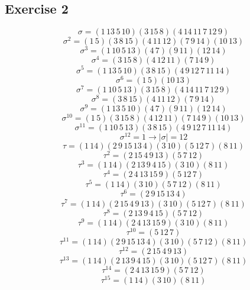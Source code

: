 \documentclass[12pt]{article}
\begin{document}
\begin{itemize}
\subsection*{Exercise 2}
$$\sigma = (1 \, 13 \, 5 \, 10)(3 \, 15 \, 8)(4 \, 14 \, 11 \, 7 \, 12 \, 9)$$
$$\sigma^2 = (1 \, 5)(3 \, 8 \, 15)(4 \, 11 \, 12)(7 \, 9 \, 14)(10 \, 13)$$
$$\sigma^3 = (1 \, 10 \, 5 \, 13)(4 \, 7)(9 \, 11)(12 \, 14)$$
$$\sigma^4 = (3 \, 15 \, 8)(4 \, 12 \, 11)(7 \, 14 \, 9)$$
$$\sigma^5 = (1 \, 13 \, 5 \, 10)(3 \, 8 \, 15)(4 \, 9 \, 12 \, 7 \, 11 \, 14)$$
$$\sigma^6 = (1 \, 5)(10 \, 13)$$
$$\sigma^7 = (1 \, 10 \, 5 \, 13)(3 \, 15 \, 8)(4 \, 14 \, 11 \, 7 \, 12 \, 9)$$
$$\sigma^8 = (3 \, 8 \, 15)(4 \, 11 \, 12)(7 \, 9 \, 14)$$
$$\sigma^9 = (1 \, 13 \, 5 \, 10)(4 \, 7)(9 \, 11)(12 \, 14)$$
$$\sigma^{10} = (1 \, 5)(3 \, 15 \, 8)(4 \, 12 \, 11)(7 \, 14 \, 9)(10 \, 13)$$
$$\sigma^{11} = (1 \, 10 \, 5 \, 13)(3 \, 8 \, 15)(4 \, 9 \, 12 \, 7 \, 11 \, 14)$$
$$\sigma^{12} = 1 \rightarrow |\sigma| = 12$$
$$\tau = (1 \, 14)(2 \, 9 \, 15 \, 13 \, 4)(3 \, 10)(5 \, 12 \, 7)(8 \, 11)$$
$$\tau^2 = (2 \, 15 \, 4 \, 9 \, 13)(5 \, 7 \, 12)$$
$$\tau^3 = (1 \, 14)(2 \, 13 \, 9 \, 4 \, 15)(3 \, 10)(8 \, 11)$$
$$\tau^4 = (2 \, 4 \, 13 \, 15 \, 9)(5 \, 12 \, 7)$$
$$\tau^5 = (1 \, 14)(3 \, 10)(5 \, 7 \, 12)(8 \, 11)$$
$$\tau^6 = (2 \, 9 \, 15 \, 13 \, 4)$$
$$\tau^7 = (1 \, 14)(2 \, 15 \, 4 \, 9 \, 13)(3 \, 10) (5 \, 12 \, 7)(8 \, 11)$$
$$\tau^8 = (2 \, 13 \, 9 \, 4 \, 15)(5 \, 7 \, 12)$$
$$\tau^9 = (1 \, 14)(2 \, 4 \, 13 \, 15 \, 9)(3 \, 10)(8 \, 11)$$
$$\tau^{10} = (5 \, 12 \, 7)$$
$$\tau^{11} = (1 \, 14)(2 \, 9 \, 15 \, 13 \, 4)(3 \, 10)(5 \, 7 \, 12)(8 \, 11)$$
$$\tau^{12} = (2 \, 15 \, 4 \, 9 \, 13)$$
$$\tau^{13} = (1 \, 14)(2 \, 13 \, 9 \, 4 \, 15)(3 \, 10)(5 \, 12 \, 7)(8 \, 11)$$
$$\tau^{14} = (2 \, 4 \, 13 \, 15 \, 9)(5 \, 7 \, 12)$$
$$\tau^{15} = (1 \, 14)(3 \, 10)(8 \, 11)$$


\end{itemize}
\end{document}
